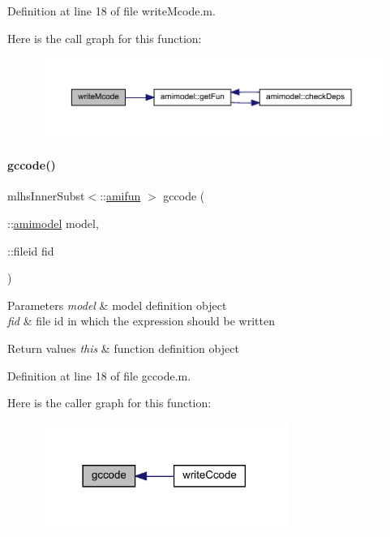 Definition at line 18 of file write\+Mcode.\+m.

Here is the call graph for this function\+:
\nopagebreak
\begin{figure}[H]
\begin{center}
\leavevmode
\includegraphics[width=350pt]{classamifun_a9b041ce0ffcfab125b5db3ed5ca847a2_cgraph}
\end{center}
\end{figure}
\mbox{\label{classamifun_a05444f498e657a0010f6b539bc9c6596}} 
\paragraph{\texorpdfstring{gccode()}{gccode()}}
{\footnotesize\ttfamily mlhs\+Inner\+Subst$<$\+::\mbox{\hyperlink{classamifun}{amifun}} $>$ gccode (\begin{DoxyParamCaption}\item[{\+::\mbox{\hyperlink{classamimodel}{amimodel}}}]{model,  }\item[{\+::fileid}]{fid }\end{DoxyParamCaption})}


\begin{DoxyParams}{Parameters}
{\em model} & model definition object \\
\hline
{\em fid} & file id in which the expression should be written\\
\hline
\end{DoxyParams}

\begin{DoxyRetVals}{Return values}
{\em this} & function definition object \\
\hline
\end{DoxyRetVals}


Definition at line 18 of file gccode.\+m.

Here is the caller graph for this function\+:
\nopagebreak
\begin{figure}[H]
\begin{center}
\leavevmode
\includegraphics[width=230pt]{classamifun_a05444f498e657a0010f6b539bc9c6596_icgraph}
\end{center}
\end{figure}
\mbox{\label{classamifun_a1cb97b695ab609e1655ec1067b140b70}} 
